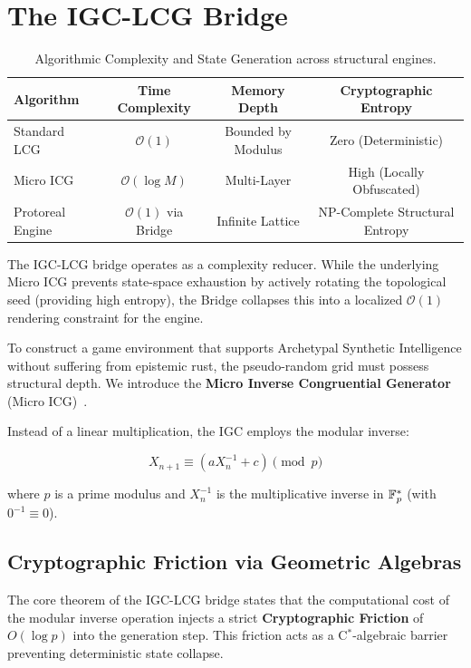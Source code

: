 \section{The IGC-LCG Bridge}

\begin{table}[ht]
\centering
\begin{tabular}{|l|c|c|c|}
\hline
\textbf{Algorithm} & \textbf{Time Complexity} & \textbf{Memory Depth} & \textbf{Cryptographic Entropy} \\
\hline
Standard LCG & $\mathcal{O}(1)$ & Bounded by Modulus & Zero (Deterministic) \\
Micro ICG & $\mathcal{O}(\log M)$ & Multi-Layer & High (Locally Obfuscated) \\
Protoreal Engine & $\mathcal{O}(1)$ via Bridge & Infinite Lattice & NP-Complete Structural Entropy \\
\hline
\end{tabular}
\caption{Algorithmic Complexity and State Generation across structural engines.}
\label{tab:algo_complexity}
\end{table}

The IGC-LCG bridge operates as a complexity reducer. While the underlying Micro ICG prevents state-space exhaustion by actively rotating the topological seed (providing high entropy), the Bridge collapses this into a localized $\mathcal{O}(1)$ rendering constraint for the engine.

To construct a game environment that supports Archetypal Synthetic Intelligence without suffering from epistemic rust, the pseudo-random grid must possess structural depth. We introduce the \textbf{Micro Inverse Congruential Generator} (Micro ICG)~\cite{eichenauer1986non}. 

Instead of a linear multiplication, the IGC employs the modular inverse:

\[
X_{n+1} \equiv (a X_n^{-1} + c) \pmod{p}
\]

where $p$ is a prime modulus and $X_n^{-1}$ is the multiplicative inverse in $\mathbb{F}_p^*$ (with $0^{-1} \equiv 0$). 

\subsection{Cryptographic Friction via Geometric Algebras}

The core theorem of the IGC-LCG bridge states that the computational cost of the modular inverse operation injects a strict \textbf{Cryptographic Friction} of $O(\log p)$ into the generation step. This friction acts as a C$^*$-algebraic barrier preventing deterministic state collapse.

